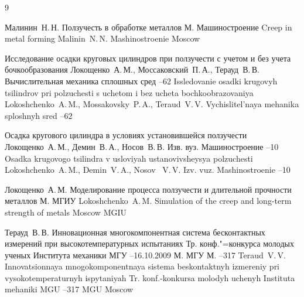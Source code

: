 \newpage

\begin{thebibliography}{9}

\by Малинин~Н.\,Н.
\book Ползучесть в обработке
металлов
\publaddr М.
\publ Машиностроение
\misctransl
\book Creep in metal forming 
\by Malinin~N.\,N.
\publ Mashinostroenie
\publaddr Moscow

\paper Исследование осадки круговых цилиндров при ползучести с учетом и без учета бочкообразования
\by Локощенко~А.\,М., Моссаковский~П.\,А., Терауд~В.\,В.
\jour Вычислительная механика сплошных сред
--62
\misctransl
\paper Issledovanie osadki krugovyh tsilindrov pri polzuchesti s uchetom i bez ucheta bochkoobrazovaniya
\by Lokoshchenko~A.\,M.,  Mossakovsky~P.\,A., Teraud~V.\,V.
\jour Vychislitel'naya mehanika sploshnyh sred
--62

\paper Осадка кругового цилиндра в условиях установившейся ползучести
\by Локощенко~А.\,М., Демин~В.\,А., Носов~В.\,В.
\jour Изв. вуз. Машиностроение
--10
\misctransl
\paper Osadka krugovogo tsilindra v usloviyah ustanovivsheysya polzuchesti
\by  Lokoshchenko~A.\,M., Demin~V.\,A., Nosov~ V.\,V.
\jour Izv. vuz. Mashinostroenie
--10


\by Локощенко~А.\,М.
\book Моделирование процесса ползучести и длительной прочности металлов
\publaddr М.
\publ МГИУ
\misctransl
\by  Lokoshchenko~A.\,M.
\book Simulation of the creep and long-term strength of metals
\publaddr Moscow
\publ MGIU

\by Терауд~В.\,В.
\paper Инновационная многокомпонентная система бесконтактных измерений при высокотемпературных испытаниях
\inbook Тр. конф."=конкурса молодых ученых Института механики МГУ 
--16.10.2009
\publaddr М.
\publ МГУ
\publaddr М.
--317
\misctransl
\by Teraud~V.\,V.
\paper Innovatsionnaya mnogokomponentnaya sistema beskontaktnyh izmereniy pri vysokotemperaturnyh ispytaniyah
\inbook Tr. konf.-konkursa molodyh uchenyh Instituta mehaniki MGU
--317
\publ MGU
\publaddr Moscow

\end{thebibliography}


\noindent
\hskip6.5cm \thedate \par\noindent
\hskip6.5cm\therevdate\par


\makeengtitle

\newpage

%
%
